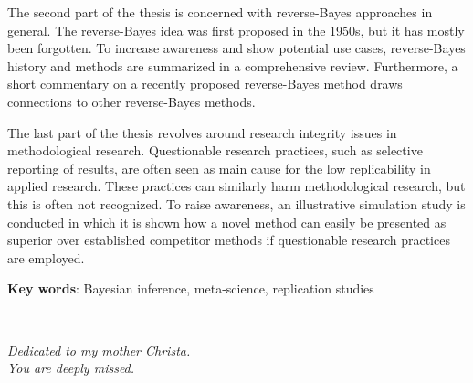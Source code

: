 The second part of the thesis is concerned with reverse-Bayes approaches in
general. The reverse-Bayes idea was first proposed in the 1950s, but it has
mostly been forgotten. To increase awareness and show potential use cases,
reverse-Bayes history and methods are summarized in a comprehensive review.
Furthermore, a short commentary on a recently proposed reverse-Bayes method
draws connections to other reverse-Bayes methods.

The last part of the thesis revolves around research integrity issues in
methodological research. Questionable research practices, such as selective
reporting of results, are often seen as main cause for the low replicability in
applied research. These practices can similarly harm methodological research,
but this is often not recognized. To raise awareness, an illustrative simulation
study is conducted in which it is shown how a novel method can easily be
presented as superior over established competitor methods if questionable
research practices are employed.


\textbf{Key words}: Bayesian inference, meta-science, replication studies


\newpage ~

\newpage



\begin{center}
  \vspace*{5cm}

  \textit{Dedicated to my mother Christa. \\
    You are deeply missed.}
\end{center}
